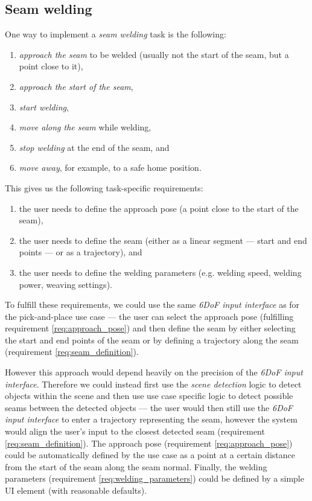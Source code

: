 \subsection{Seam welding} \label{subsec:ch2_analysis_seam_welding}

One way to implement a \emph{seam welding} task is the following:
\begin{enumerate}[label=(\arabic*), itemsep=0.2em]
    \item \emph{approach the seam} to be welded (usually not the start of the seam, but a point close to it),
    \item \emph{approach the start of the seam},
    \item \emph{start welding},
    \item \emph{move along the seam} while welding,
    \item \emph{stop welding} at the end of the seam, and
    \item \emph{move away}, for example, to a safe home position.
\end{enumerate}

This gives us the following task-specific requirements:
\begin{enumerate}[label=(\roman*), itemsep=0.2em]
    \item the user needs to define the approach pose (a point close to the start of the seam), \label{req:approach_pose}
    \item the user needs to define the seam (either as a linear segment --- start and end points --- or as a trajectory), and \label{req:seam_definition}
    \item the user needs to define the welding parameters (e.g. welding speed, welding power, weaving settings). \label{req:welding_parameters}
\end{enumerate}
To fulfill these requirements, we could use the same \emph{6DoF input interface} as for the pick-and-place use case --- the user can select the approach pose (fulfilling requirement \ref{req:approach_pose}) and then define the seam by either selecting the start and end points of the seam or by defining a trajectory along the seam (requirement \ref{req:seam_definition}).

However this approach would depend heavily on the precision of the \emph{6DoF input interface}. Therefore we could instead first use the \emph{scene detection} logic to detect objects within the scene and then use use case specific logic to detect possible seams between the detected objects --- the user would then still use the \emph{6DoF input interface} to enter a trajectory representing the seam, however the system would align the user's input to the closest detected seam (requirement \ref{req:seam_definition}). The approach pose (requirement \ref{req:approach_pose}) could be automatically defined by the use case as a point at a certain distance from the start of the seam along the seam normal. Finally, the welding parameters (requirement \ref{req:welding_parameters}) could be defined by a simple UI element (with reasonable defaults).

